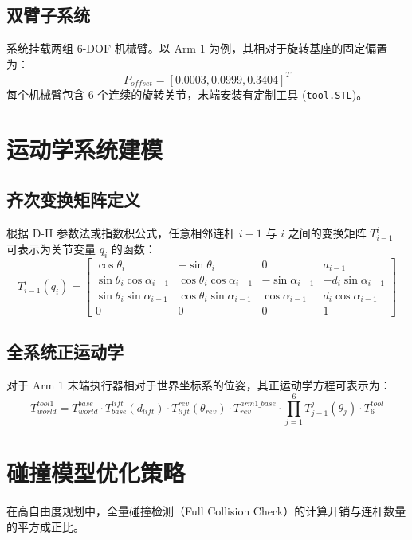 \documentclass[12pt,a4paper]{article}
\begin{document}
\subsection{双臂子系统}
系统挂载两组 6-DOF 机械臂。以 Arm 1 为例，其相对于旋转基座的固定偏置为：
\begin{equation}
    P_{offset} = [0.0003, 0.0999, 0.3404]^T
\end{equation}
每个机械臂包含 6 个连续的旋转关节，末端安装有定制工具 (\texttt{tool.STL})。

\section{运动学系统建模}

\subsection{齐次变换矩阵定义}
根据 D-H 参数法或指数积公式，任意相邻连杆 $i-1$ 与 $i$ 之间的变换矩阵 $T_{i-1}^{i}$ 可表示为关节变量 $q_i$ 的函数：
\begin{equation}
T_{i-1}^{i}(q_i) = 
\begin{bmatrix}
\cos \theta_i & -\sin \theta_i & 0 & a_{i-1} \\
\sin \theta_i \cos \alpha_{i-1} & \cos \theta_i \cos \alpha_{i-1} & -\sin \alpha_{i-1} & -d_i \sin \alpha_{i-1} \\
\sin \theta_i \sin \alpha_{i-1} & \cos \theta_i \sin \alpha_{i-1} & \cos \alpha_{i-1} & d_i \cos \alpha_{i-1} \\
0 & 0 & 0 & 1
\end{bmatrix}
\end{equation}

\subsection{全系统正运动学}
对于 Arm 1 末端执行器相对于世界坐标系的位姿，其正运动学方程可表示为：
\begin{equation}
T_{world}^{tool1} = T_{world}^{base} \cdot T_{base}^{lift}(d_{lift}) \cdot T_{lift}^{rev}(\theta_{rev}) \cdot T_{rev}^{arm1\_base} \cdot \prod_{j=1}^{6} T_{j-1}^{j}(\theta_j) \cdot T_{6}^{tool}
\end{equation}

\section{碰撞模型优化策略}
在高自由度规划中，全量碰撞检测（Full Collision Check）的计算开销与连杆数量的平方成正比。
\end{document}
